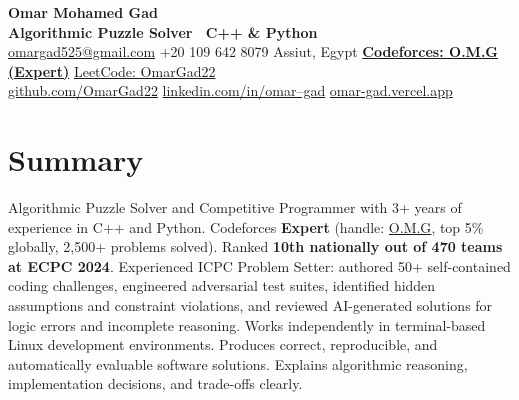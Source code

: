 \documentclass[letterpaper,10pt]{article}
\begin{document}
\pagestyle{empty}

{\LARGE\bfseries Omar Mohamed Gad}\\[2pt]
{\large\bfseries Algorithmic Puzzle Solver \textbar\ C++ \& Python}\\[4pt]
{\small
  \href{mailto:omargad525@gmail.com}{omargad525@gmail.com} \hspace{4pt}\textbar\hspace{4pt}
  +20 109 642 8079 \hspace{4pt}\textbar\hspace{4pt}
  Assiut, Egypt \hspace{4pt}\textbar\hspace{4pt}
  \href{https://codeforces.com/profile/O.M.G}{\textbf{Codeforces: O.M.G (Expert)}} \hspace{4pt}\textbar\hspace{4pt}
  \href{https://leetcode.com/u/OmarGad22/}{LeetCode: OmarGad22}\\[1pt]
  \href{https://github.com/OmarGad22}{github.com/OmarGad22} \hspace{4pt}\textbar\hspace{4pt}
  \href{https://www.linkedin.com/in/omar--gad/}{linkedin.com/in/omar--gad} \hspace{4pt}\textbar\hspace{4pt}
  \href{https://omar-gad.vercel.app}{omar-gad.vercel.app}
}

\vspace{5pt}

\section{Summary}

Algorithmic Puzzle Solver and Competitive Programmer with 3+ years of experience in C++ and Python. Codeforces \textbf{Expert} (handle: \href{https://codeforces.com/profile/O.M.G}{O.M.G}, top 5\% globally, 2,500+ problems solved). Ranked \textbf{10th nationally out of 470 teams at ECPC 2024}. Experienced ICPC Problem Setter: authored 50+ self-contained coding challenges, engineered adversarial test suites, identified hidden assumptions and constraint violations, and reviewed AI-generated solutions for logic errors and incomplete reasoning. Works independently in terminal-based Linux development environments. Produces correct, reproducible, and automatically evaluable software solutions. Explains algorithmic reasoning, implementation decisions, and trade-offs clearly.
\end{document}
